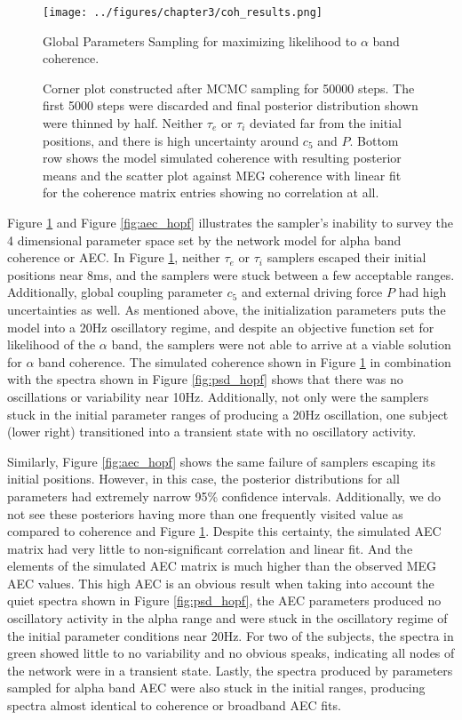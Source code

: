 \begin{figure}[htbp]
    \centering
    \texttt{[image: ../figures/chapter3/coh\_results.png]}
    \caption{Global Parameters Sampling for maximizing likelihood to $\alpha$ band coherence.}
    \caption*{Corner plot constructed after MCMC sampling for 50000 steps. The first 5000 steps were discarded and final posterior distribution shown were thinned by half. Neither $\tau_e$ or $\tau_i$ deviated far from the initial positions, and there is high uncertainty around $c_5$ and $P$. Bottom row shows the model simulated coherence with resulting posterior means and the scatter plot against MEG coherence with linear fit for the coherence matrix entries showing no correlation at all.}
    \label{fig:coh_hopf}
\end{figure}

Figure \ref{fig:coh_hopf} and Figure \ref{fig:aec_hopf} illustrates the sampler's inability to survey the 4 dimensional parameter space set by the network model for alpha band coherence or AEC. In Figure \ref{fig:coh_hopf}, neither $\tau_e$ or $\tau_i$ samplers escaped their initial positions near 8ms, and the samplers were stuck between a few acceptable ranges. Additionally, global coupling parameter $c_5$ and external driving force $P$ had high uncertainties as well. As mentioned above, the initialization parameters puts the model into a 20Hz oscillatory regime, and despite an objective function set for likelihood of the $\alpha$ band, the samplers were not able to arrive at a viable solution for $\alpha$ band coherence. The simulated coherence shown in Figure \ref{fig:coh_hopf} in combination with the spectra shown in Figure \ref{fig:psd_hopf} shows that there was no oscillations or variability near 10Hz. Additionally, not only were the samplers stuck in the initial parameter ranges of producing a 20Hz oscillation, one subject (lower right) transitioned into a transient state with no oscillatory activity. 

Similarly, Figure \ref{fig:aec_hopf} shows the same failure of samplers escaping its initial positions. However, in this case, the posterior distributions for all parameters had extremely narrow 95\% confidence intervals. Additionally, we do not see these posteriors having more than one frequently visited value as compared to coherence and Figure \ref{fig:coh_hopf}. Despite this certainty, the simulated AEC matrix had very little to non-significant correlation and linear fit. And the elements of the simulated AEC matrix is much higher than the observed MEG AEC values. This high AEC is an obvious result when taking into account the quiet spectra shown in Figure \ref{fig:psd_hopf}, the AEC parameters produced no oscillatory activity in the alpha range and were stuck in the oscillatory regime of the initial parameter conditions near 20Hz. For two of the subjects, the spectra in green showed little to no variability and no obvious speaks, indicating all nodes of the network were in a transient state. Lastly, the spectra produced by parameters sampled for alpha band AEC were also stuck in the initial ranges, producing spectra almost identical to coherence or broadband AEC fits. 

